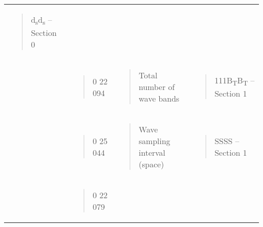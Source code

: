 \begin{longtable}[]{@{}llll@{}}
\begin{minipage}[t]{0.22\columnwidth}
\begin{quote}
d\textsubscript{s}d\textsubscript{s} -- Section 0
\end{quote}\strut
\end{minipage}\tabularnewline
\begin{minipage}[t]{0.22\columnwidth}\raggedright
\strut
\end{minipage} & \begin{minipage}[t]{0.22\columnwidth}\raggedright
\begin{quote}
0 22 094
\end{quote}\strut
\end{minipage} & \begin{minipage}[t]{0.22\columnwidth}\raggedright
\begin{quote}
Total number of wave bands
\end{quote}\strut
\end{minipage} & \begin{minipage}[t]{0.22\columnwidth}\raggedright
\begin{quote}
111B\textsubscript{T}B\textsubscript{T} -- Section 1
\end{quote}\strut
\end{minipage}\tabularnewline
\begin{minipage}[t]{0.22\columnwidth}\raggedright
\strut
\end{minipage} & \begin{minipage}[t]{0.22\columnwidth}\raggedright
\begin{quote}
0 25 044
\end{quote}\strut
\end{minipage} & \begin{minipage}[t]{0.22\columnwidth}\raggedright
\begin{quote}
Wave sampling interval (space)
\end{quote}\strut
\end{minipage} & \begin{minipage}[t]{0.22\columnwidth}\raggedright
\begin{quote}
SSSS -- Section 1
\end{quote}\strut
\end{minipage}\tabularnewline
\begin{minipage}[t]{0.22\columnwidth}\raggedright
\strut
\end{minipage} & \begin{minipage}[t]{0.22\columnwidth}\raggedright
\begin{quote}
0 22 079
\end{quote}\strut

\end{minipage}
\end{longtable}
